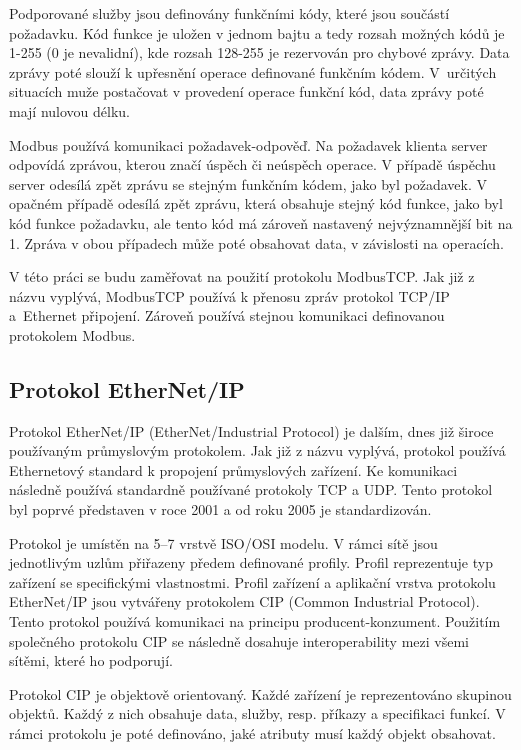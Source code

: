 Podporované služby jsou definovány funkčními kódy, které jsou součástí požadavku. Kód funkce je uložen v jednom bajtu a tedy rozsah možných kódů je 1-255 (0 je nevalidní), kde rozsah 128-255 je rezervován pro chybové zprávy. Data zprávy poté slouží k upřesnění operace definované funkčním kódem. V~určitých situacích muže postačovat v provedení operace funkční kód, data zprávy poté mají nulovou délku.

Modbus používá komunikaci požadavek-odpověď. Na požadavek klienta server odpovídá zprávou, kterou značí úspěch či neúspěch operace. V případě úspěchu server odesílá zpět zprávu se stejným funkčním kódem, jako byl požadavek. V opačném případě odesílá zpět zprávu, která obsahuje stejný kód funkce, jako byl kód funkce požadavku, ale tento kód má zároveň nastavený nejvýznamnější bit na 1. Zpráva v obou případech může poté obsahovat data, v závislosti na operacích. \cite{modbus}

V této práci se budu zaměřovat na použití protokolu ModbusTCP. Jak již z názvu vyplývá, ModbusTCP používá k přenosu zpráv protokol TCP/IP a~Ethernet připojení. Zároveň používá stejnou komunikaci definovanou protokolem Modbus.

\subsection{Protokol EtherNet/IP}
Protokol EtherNet/IP (EtherNet/Industrial Protocol) je dalším, dnes již široce používaným průmyslovým protokolem. Jak již z názvu vyplývá, protokol používá Ethernetový standard k propojení průmyslových zařízení. Ke komunikaci následně používá standardně používané protokoly TCP a UDP. Tento protokol byl poprvé představen v roce 2001 a od roku 2005 je standardizován. 

Protokol je umístěn na 5--7 vrstvě ISO/OSI modelu. V rámci sítě jsou jednotlivým uzlům přiřazeny předem definované profily. Profil reprezentuje typ zařízení se specifickými vlastnostmi. Profil zařízení a aplikační vrstva protokolu EtherNet/IP jsou vytvářeny protokolem CIP (Common Industrial Protocol). Tento protokol používá komunikaci na principu producent-konzument. Použitím společného protokolu CIP se následně dosahuje interoperability mezi všemi sítěmi, které ho podporují. 

Protokol CIP je objektově orientovaný. Každé zařízení je reprezentováno skupinou objektů. Každý z nich obsahuje data, služby, resp. příkazy a specifikaci funkcí. V rámci protokolu je poté definováno, jaké atributy musí každý objekt obsahovat.

